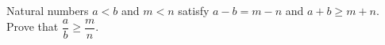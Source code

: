 Natural numbers $a<b$ and $m<n$ satisfy $a-b=m-n$ and $a+b\ge m+n$. Prove that $\dfrac ab\ge\dfrac mn$.
